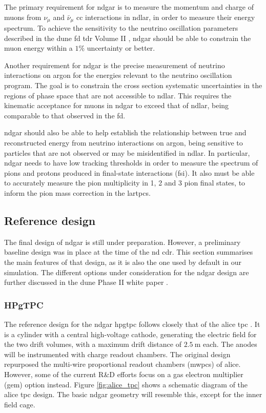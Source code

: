 The primary requirement for \gls{ndgar} is to measure the momentum and charge of muons from $\nu_{\mu}$ and $\bar{\nu}_{\mu}$ \gls{cc} interactions in \gls{ndlar}, in order to measure their energy spectrum. To achieve the sensitivity to the neutrino oscillation parameters described in the \gls{dune} \gls{fd} \gls{tdr} Volume II \cite{DUNE2020TDR2}, \gls{ndgar} should be able to constrain the muon energy within a $1\%$ uncertainty or better.

Another requirement for \gls{ndgar} is the precise measurement of neutrino interactions on argon for the energies relevant to the neutrino oscillation program. The goal is to constrain the cross section systematic uncertainties in the regions of phase space that are not accessible to \gls{ndlar}. This requires the kinematic acceptance for muons in \gls{ndgar} to exceed that of \gls{ndlar}, being comparable to that observed in the \gls{fd}.

\gls{ndgar} should also be able to help establish the relationship between true and reconstructed energy from neutrino interactions on argon, being sensitive to particles that are not observed or may be misidentified in \gls{ndlar}. In particular, \gls{ndgar} needs to have low tracking thresholds in order to measure the spectrum of pions and protons produced in final-state interactions (\gls{fsi}). It also must be able to accurately measure the pion multiplicity in 1, 2 and 3 pion final states, to inform the pion mass correction in the \gls{lartpc}s.

\subsection{Reference design}\label{subsec:ndgar_design}

The final design of \gls{ndgar} is still under preparation. However, a preliminary baseline design was in place at the time of the \gls{nd} \gls{cdr}. This section summarises the main features of that design, as it is also the one used by default in our simulation. The different options under consideration for the \gls{ndgar} design are further discussed in the \gls{dune} Phase II white paper \cite{DUNE2024Phase2}.

\subsubsection{HPgTPC}

The reference design for the \gls{ndgar} \gls{hpgtpc} follows closely that of the \gls{alice} \gls{tpc} \cite{ALICE2006}. It is a cylinder with a central high-voltage cathode, generating the electric field for the two drift volumes, with a maximum drift distance of $2.5~\mathrm{m}$ each. The anodes will be instrumented with charge readout chambers. The original design repurposed the multi-wire proportional readout chambers (\gls{mwpc}s) of \gls{alice}. However, some of the current R\&D efforts focus on a gas electron multiplier (\gls{gem}) \cite{Sauli1997} option instead. Figure \ref{fig:alice_tpc} shows a schematic diagram of the \gls{alice} \gls{tpc} design. The basic \gls{ndgar} geometry will resemble this, except for the inner field cage.

